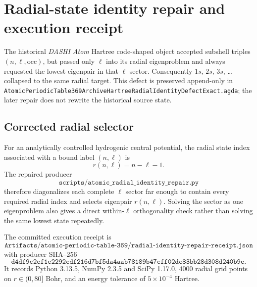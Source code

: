
\section{Radial-state identity repair and execution receipt}

The historical \emph{DASHI Atom} Hartree code-shaped object accepted subshell
triples $(n,\ell,\mathrm{occ})$, but passed only $\ell$ into its radial
eigenproblem and always requested the lowest eigenpair in that $\ell$ sector.
Consequently $1s$, $2s$, $3s$, \ldots{} collapsed to the same radial target.
This defect is preserved append-only in
\texttt{AtomicPeriodicTable369ArchiveHartreeRadialIdentityDefectExact.agda}; the
later repair does not rewrite the historical source state.

\subsection{Corrected radial selector}

For an analytically controlled hydrogenic central potential, the radial state
index associated with a bound label $(n,\ell)$ is
\[
  r(n,\ell)=n-\ell-1.
\]
The repaired producer
\[
  \texttt{scripts/atomic\_radial\_identity\_repair.py}
\]
therefore diagonalizes each complete $\ell$ sector far enough to contain every
required radial index and selects eigenpair $r(n,\ell)$. Solving the sector as
one eigenproblem also gives a direct within-$\ell$ orthogonality check rather
than solving the same lowest state repeatedly.

The committed execution receipt is
\[
\texttt{Artifacts/atomic-periodic-table-369/radial-identity-repair-receipt.json}
\]
with producer SHA--256
\[
\texttt{d4df9c2ef1e2292cdf216d7bf5da4aab78189b47cff02dc83bb28d308d240b9e}.
\]
It records Python 3.13.5, NumPy 2.3.5 and SciPy 1.17.0, $4000$ radial grid
points on $r\in(0,80]$ Bohr, and an energy tolerance of $5\times 10^{-4}$
Hartree.

